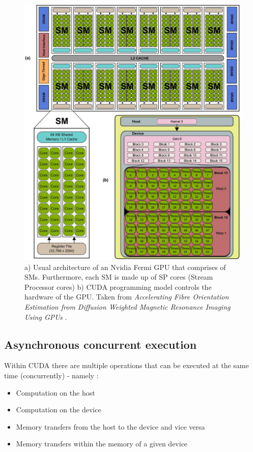 \begin{figure}[h!]
	\centering
	\includegraphics[width=\textwidth, keepaspectratio]{images/ch1/nvidia_gpu_sms_cuda.png}
	\caption{a) Usual architecture of an Nvidia Fermi GPU that comprises of SMs. Furthermore, each SM is made up of SP cores (Stream Processor cores) b) CUDA programming model controls the hardware of the GPU. Taken from \textit{Accelerating Fibre Orientation Estimation from Diffusion Weighted Magnetic Resonance Imaging Using GPUs} \cite{Hernandez2013429}.}
	\label{Figure:Nvidia-GPU-structure-CUDA-thread-structure}
\end{figure}

\subsection{Asynchronous concurrent execution \TO}\label{Subsection:CUDA-asynchronous-concurrent-execution}
Within CUDA there are multiple operations that can be executed at the same time (concurrently) - namely \cite{NVIDIAMay2022}:
\begin{itemize}
	\item Computation on the host
	\item Computation on the device
	\item Memory transfers from the host to the device and vice versa
	\item Memory transfers within the memory of a given device
\end{itemize}

